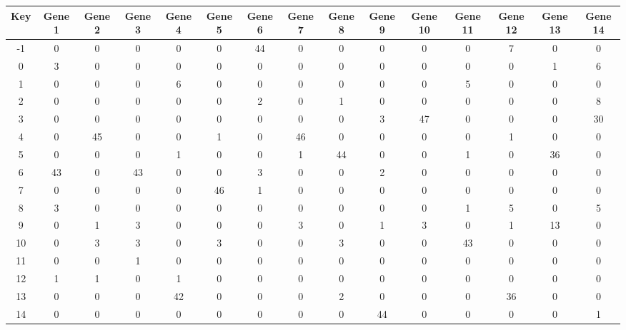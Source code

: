 \begin{tabular}{|c|c|c|c|c|c|c|c|c|c|c|c|c|c|c|}
\hline
Key & Gene 1 & Gene 2 & Gene 3 & Gene 4 & Gene 5 & Gene 6 & Gene 7 & Gene 8 & Gene 9 & Gene 10 & Gene 11 & Gene 12 & Gene 13 & Gene 14 \\
\hline
-1 & 0 & 0 & 0 & 0 & 0 & 44 & 0 & 0 & 0 & 0 & 0 & 7 & 0 & 0 \\
0 & 3 & 0 & 0 & 0 & 0 & 0 & 0 & 0 & 0 & 0 & 0 & 0 & 1 & 6 \\
1 & 0 & 0 & 0 & 6 & 0 & 0 & 0 & 0 & 0 & 0 & 5 & 0 & 0 & 0 \\
2 & 0 & 0 & 0 & 0 & 0 & 2 & 0 & 1 & 0 & 0 & 0 & 0 & 0 & 8 \\
3 & 0 & 0 & 0 & 0 & 0 & 0 & 0 & 0 & 3 & 47 & 0 & 0 & 0 & 30 \\
4 & 0 & 45 & 0 & 0 & 1 & 0 & 46 & 0 & 0 & 0 & 0 & 1 & 0 & 0 \\
5 & 0 & 0 & 0 & 1 & 0 & 0 & 1 & 44 & 0 & 0 & 1 & 0 & 36 & 0 \\
6 & 43 & 0 & 43 & 0 & 0 & 3 & 0 & 0 & 2 & 0 & 0 & 0 & 0 & 0 \\
7 & 0 & 0 & 0 & 0 & 46 & 1 & 0 & 0 & 0 & 0 & 0 & 0 & 0 & 0 \\
8 & 3 & 0 & 0 & 0 & 0 & 0 & 0 & 0 & 0 & 0 & 1 & 5 & 0 & 5 \\
9 & 0 & 1 & 3 & 0 & 0 & 0 & 3 & 0 & 1 & 3 & 0 & 1 & 13 & 0 \\
10 & 0 & 3 & 3 & 0 & 3 & 0 & 0 & 3 & 0 & 0 & 43 & 0 & 0 & 0 \\
11 & 0 & 0 & 1 & 0 & 0 & 0 & 0 & 0 & 0 & 0 & 0 & 0 & 0 & 0 \\
12 & 1 & 1 & 0 & 1 & 0 & 0 & 0 & 0 & 0 & 0 & 0 & 0 & 0 & 0 \\
13 & 0 & 0 & 0 & 42 & 0 & 0 & 0 & 2 & 0 & 0 & 0 & 36 & 0 & 0 \\
14 & 0 & 0 & 0 & 0 & 0 & 0 & 0 & 0 & 44 & 0 & 0 & 0 & 0 & 1 \\
\hline
\end{tabular}